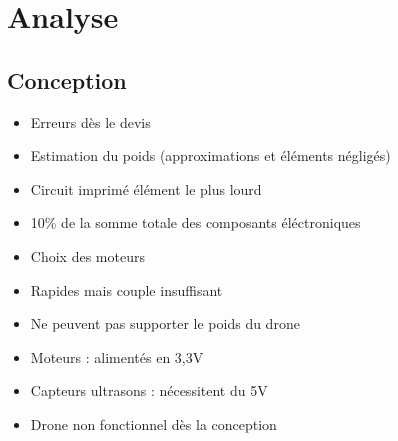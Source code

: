 \documentclass{beamer}
\begin{document}
  {
    \section{Analyse}
    
      \begin{frame}
	\tableofcontents[hideothersubsections]
      \end{frame}
      
      \subsection{Conception}
	\begin{frame}
	  \begin{itemize}
	    \item Erreurs dès le devis
	    \item Estimation du poids (approximations et éléments négligés)
	    \item Circuit imprimé élément le plus lourd
	    \item 10\% de la somme totale des composants éléctroniques
	  \end{itemize}
	\end{frame}
	
	\begin{frame}
	  \begin{itemize}
	    \item Choix des moteurs
	    \item Rapides mais couple insuffisant
	    \item Ne peuvent pas supporter le poids du drone
	  \end{itemize}
	\end{frame}
	
	\begin{frame}
	  \begin{itemize}
	    \item Moteurs : alimentés en 3,3V
	    \item Capteurs ultrasons : nécessitent du 5V
	    \item Drone non fonctionnel dès la conception
	  \end{itemize}
	\end{frame}
	
}
\end{document}
